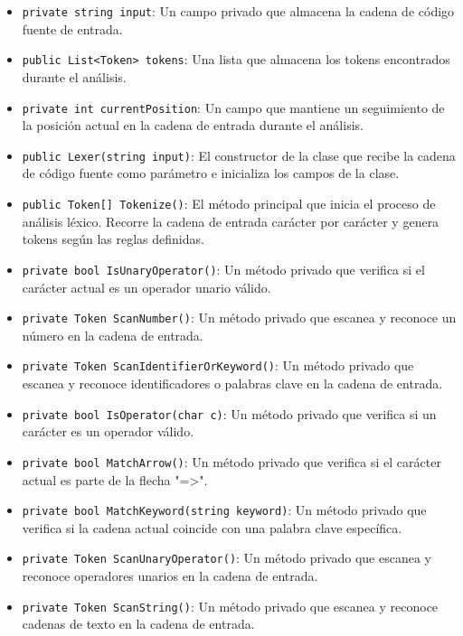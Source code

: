 \documentclass{article}
\begin{document}
\begin{itemize}[left=0pt]
    \item \textcolor{fieldcolor}{\lstinline{private string input}}: Un campo privado que almacena la cadena de código fuente de entrada.

    \item \textcolor{fieldcolor}{\lstinline{public List<Token> tokens}}: Una lista que almacena los tokens encontrados durante el análisis.

    \item \textcolor{fieldcolor}{\lstinline{private int currentPosition}}: Un campo que mantiene un seguimiento de la posición actual en la cadena de entrada durante el análisis.

    \item \textcolor{constructorcolor}{\lstinline{public Lexer(string input)}}: El constructor de la clase que recibe la cadena de código fuente como parámetro e inicializa los campos de la clase.

    \item \textcolor{methodcolor}{\lstinline{public Token[] Tokenize()}}: El método principal que inicia el proceso de análisis léxico. Recorre la cadena de entrada carácter por carácter y genera tokens según las reglas definidas.
    \item \textcolor{methodcolor}{\lstinline{private bool IsUnaryOperator()}}: Un método privado que verifica si el carácter actual es un operador unario válido.

    \item \textcolor{methodcolor}{\lstinline{private Token ScanNumber()}}: Un método privado que escanea y reconoce un número en la cadena de entrada.

    \item \textcolor{methodcolor}{\lstinline{private Token ScanIdentifierOrKeyword()}}: Un método privado que escanea y reconoce identificadores o palabras clave en la cadena de entrada.

    \item \textcolor{methodcolor}{\lstinline{private bool IsOperator(char c)}}: Un método privado que verifica si un carácter es un operador válido.

    \item \textcolor{methodcolor}{\lstinline{private bool MatchArrow()}}: Un método privado que verifica si el carácter actual es parte de la flecha "=>".

    \item \textcolor{methodcolor}{\lstinline{private bool MatchKeyword(string keyword)}}: Un método privado que verifica si la cadena actual coincide con una palabra clave específica.

    \item \textcolor{methodcolor}{\lstinline{private Token ScanUnaryOperator()}}: Un método privado que escanea y reconoce operadores unarios en la cadena de entrada.

    \item \textcolor{methodcolor}{\lstinline{private Token ScanString()}}: Un método privado que escanea y reconoce cadenas de texto en la cadena de entrada.
\end{itemize}
\end{document}
